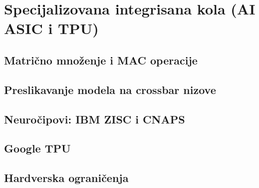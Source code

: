 \section{Specijalizovana integrisana kola (AI ASIC i TPU)}

\subsection{Matrično množenje i MAC operacije}

\subsection{Preslikavanje modela na crossbar nizove}

\subsection{Neuročipovi: IBM ZISC i CNAPS}

\subsection{Google TPU}

\subsection{Hardverska ograničenja}
